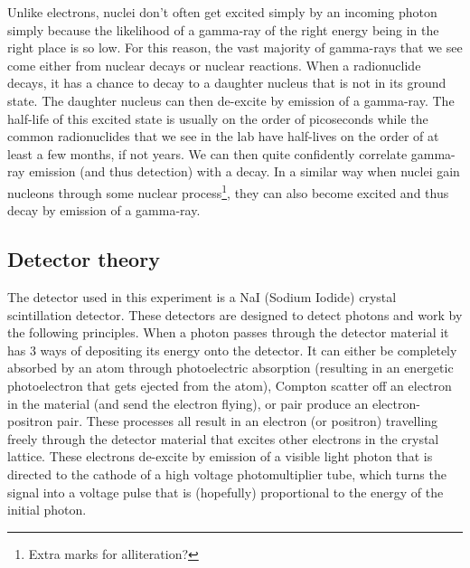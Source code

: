\documentclass[11pt]{article}
\numberwithin{equation}{section}
\numberwithin{figure}{section}
\numberwithin{table}{section}
\begin{document}
Unlike electrons, nuclei don't often get excited simply by an incoming photon simply because the likelihood of a gamma-ray of the right energy being in the right place is so low. For this reason, the vast majority of gamma-rays that we see come either from nuclear decays or nuclear reactions. When a radionuclide decays, it has a chance to decay to a daughter nucleus that is not in its ground state. The daughter nucleus can then de-excite by emission of a gamma-ray. The half-life of this excited state is usually on the order of picoseconds while the common radionuclides that we see in the lab have half-lives on the order of at least a few months, if not years. We can then quite confidently correlate gamma-ray emission (and thus detection) with a decay. In a similar way when nuclei gain nucleons through some nuclear process\footnote[1]{Extra marks for alliteration?}, they can also become excited and thus decay by emission of a gamma-ray. 

\subsection{Detector theory}\label{sec:DetectorTheory}
The detector used in this experiment is a NaI (Sodium Iodide) crystal scintillation detector. These detectors are designed to detect photons and work by the following principles. When a photon passes through the detector material it has 3 ways of depositing its energy onto the detector. It can either be completely absorbed by an atom through photoelectric absorption (resulting in an energetic photoelectron that gets ejected from the atom), Compton scatter off an electron in the material (and send the electron flying), or pair produce an electron-positron pair. These processes all result in an electron (or positron) travelling freely through the detector material that excites other electrons in the crystal lattice. These electrons de-excite by emission of a visible light photon that is directed to the cathode of a high voltage photomultiplier tube, which turns the signal into a voltage pulse that is (hopefully) proportional to the energy of the initial photon.
\end{document}
